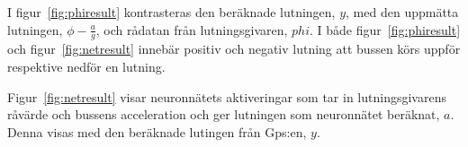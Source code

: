 I figur~\ref{fig:phiresult} kontrasteras den beräknade lutningen, $y$, med den
uppmätta lutningen, $ \phi - \frac{a}{g} $, och rådatan från
lutningsgivaren, $phi$.
I både figur~\ref{fig:phiresult} och figur~\ref{fig:netresult}
innebär positiv och negativ lutning att bussen körs uppför respektive
nedför en lutning.

Figur~\ref{fig:netresult} visar neuronnätets aktiveringar som tar in
lutningsgivarens råvärde och bussens acceleration
och ger lutningen som neuronnätet beräknat, $a$.
Denna visas med den beräknade lutingen från Gps:en, $y$.
